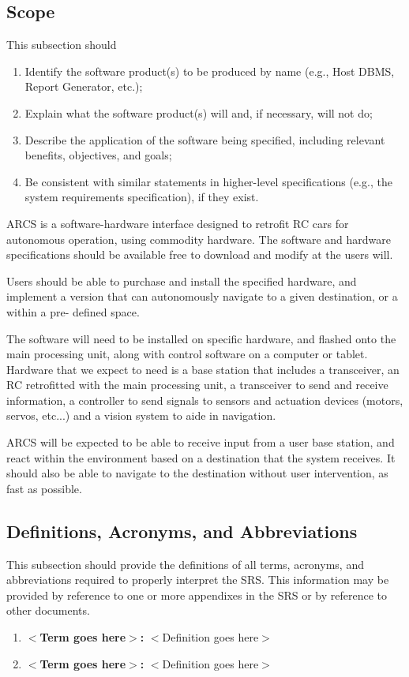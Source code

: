\documentclass[draftclsnofoot,onecolumn,10pt]{IEEEtran}
\begin{document}
\subsection{Scope}
This subsection should
\begin{enumerate}
	\item Identify the software product(s) to be produced by name (e.g., Host
		DBMS, Report Generator, etc.);
	\item Explain what the software product(s) will and, if necessary, will not
		do;
	\item Describe the application of the software being specified, including
		relevant benefits, objectives, and goals;
	\item Be consistent with similar statements in higher-level specifications
		(e.g., the system requirements specification), if they exist.
\end{enumerate}
ARCS is a software-hardware interface designed to retrofit RC cars for autonomous 
operation, using commodity hardware. The software and hardware specifications 
should be available free to download and modify at the users will. \par
Users should be able to purchase and install the specified hardware, and implement a 
version that can autonomously navigate to a given destination, or a within a pre-
defined space.  \par
The software will need to be installed on specific hardware, and flashed onto the 
main processing unit, along with control software on a computer or tablet. Hardware 
that we expect to need is a base station that includes a transceiver, an RC retrofitted 
with the main processing unit, a transceiver to send and receive information, a 
controller to send signals to sensors and actuation devices (motors, servos, etc...) and
a vision system to aide in navigation. \par
ARCS will be expected to be able to receive input from a user base station, and react
within the environment based on a destination that the system receives. It should also
be able to navigate to the destination without user intervention, as fast as possible. \par

\subsection{Definitions, Acronyms, and Abbreviations}
This subsection should provide the definitions of all terms, acronyms, and
abbreviations required to properly interpret the SRS. This information may be
provided by reference to one or more appendixes in the SRS or by reference to
other documents.
\begin{enumerate}
	\item \textbf{$<$Term goes here$>$:} $<$Definition goes here$>$
	\item \textbf{$<$Term goes here$>$:} $<$Definition goes here$>$
\end{enumerate}
\end{document}
